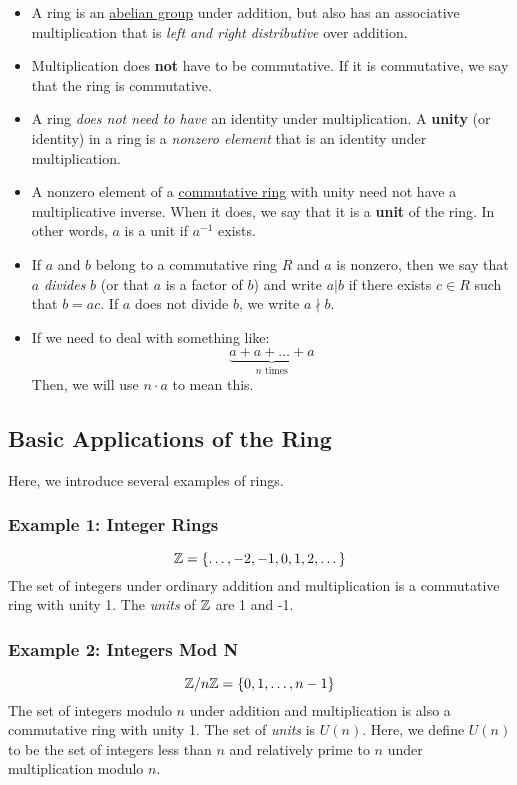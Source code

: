 \documentclass[letterpaper]{article}
\begin{document}
\begin{itemize}
    \item A ring is an \underline{abelian group} under addition, but also has an associative multiplication that is \emph{left and right distributive} over addition.
    \item Multiplication does \textbf{not} have to be commutative. If it is commutative, we say that the ring is commutative.
    \item A ring \emph{does not need to have} an identity under multiplication. A \textbf{unity} (or identity) in a ring is a \emph{nonzero element} that is an identity under multiplication.
    \item A nonzero element of a \underline{commutative ring} with unity need not have a multiplicative inverse. When it does, we say that it is a \textbf{unit} of the ring. In other words, $a$ is a unit if $a^{-1}$ exists. 
    \item If $a$ and $b$ belong to a commutative ring $R$ and $a$ is nonzero, then we say that $a$ \emph{divides} $b$ (or that $a$ is a factor of $b$) and write $a | b$ if there exists $c \in R$ such that $b = ac$. If $a$ does not divide $b$, we write $a \nmid b$.
    \item If we need to deal with something like:
    \[\underbrace{a + a + \dots + a}_{n \text{ times}}\]
    Then, we will use $n \cdot a$ to mean this. 
\end{itemize}


\subsection{Basic Applications of the Ring}
Here, we introduce several examples of rings. 

\subsubsection{Example 1: Integer Rings}
\[\mathbb{Z} = \{\dots, -2, -1, 0, 1, 2, \dots\}\]
The set of integers under ordinary addition and multiplication is a commutative ring with unity 1. The \emph{units} of $\mathbb{Z}$ are 1 and -1.

\subsubsection{Example 2: Integers Mod N}
\[\mathbb{Z} / n\mathbb{Z} = \{0, 1, \dots, n - 1\}\]
The set of integers modulo $n$ under addition and multiplication is also a commutative ring with unity 1. The set of \emph{units} is $U(n)$. Here, we define $U(n)$ to be the set of integers less than $n$ and relatively prime to $n$ under multiplication modulo $n$. 
\end{document}
